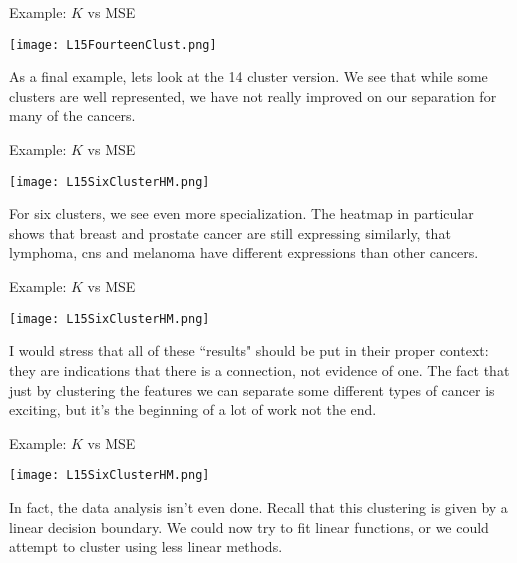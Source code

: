 \documentclass[10pt, table, dvipsnames,xcdraw,handout]{beamer}
\begin{document}
\begin{frame}[fragile]{Example: $K$ vs MSE}
  \begin{minipage}[t][0.5\textheight][t]{\textwidth}
	\centering \texttt{[image: L15FourteenClust.png]} 
  \end{minipage}
  \vfill
\begin{minipage}[t][0.5\textheight][t]{\textwidth}
As a final example, lets look at the 14 cluster version. We see that while some clusters are well represented, we have not really improved on our separation for many of the cancers. 
\end{minipage}
\end{frame}



\begin{frame}[fragile]{Example: $K$ vs MSE}
  \begin{minipage}[t][0.5\textheight][t]{\textwidth}
	\centering \texttt{[image: L15SixClusterHM.png]} 
  \end{minipage}
  \vfill
\begin{minipage}[t][0.5\textheight][t]{\textwidth}
For six clusters, we see even more specialization. The heatmap in particular shows that breast and prostate cancer are still expressing similarly, that lymphoma, cns and melanoma have different expressions than other cancers.
\end{minipage}
\end{frame}



\begin{frame}[fragile]{Example: $K$ vs MSE}
  \begin{minipage}[t][0.5\textheight][t]{\textwidth}
	\centering \texttt{[image: L15SixClusterHM.png]} 
  \end{minipage}
  \vfill
\begin{minipage}[t][0.5\textheight][t]{\textwidth}
I would stress that all of these ``results" should be put in their proper context: they are indications that there is a connection, not evidence of one. The fact that just by clustering the features we can separate some different types of cancer is exciting, but it's the beginning of a lot of work not the end.
\end{minipage}
\end{frame}




\begin{frame}[fragile]{Example: $K$ vs MSE}
  \begin{minipage}[t][0.5\textheight][t]{\textwidth}
	\centering \texttt{[image: L15SixClusterHM.png]} 
  \end{minipage}
  \vfill
\begin{minipage}[t][0.5\textheight][t]{\textwidth}
In fact, the data analysis isn't even done. Recall that this clustering is given by a linear decision boundary. We could now try to fit linear functions, or we could attempt to cluster using less linear methods. 
\end{minipage}
\end{frame}
\end{document}
